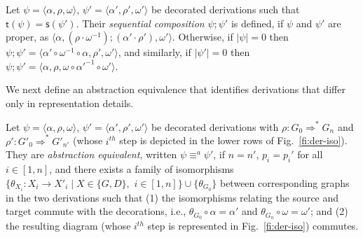 \documentclass[conference]{IEEEtran}
\newcommand{\Rrel}[1]   {\stackrel{{#1}}{\Longrightarrow}}
\newcommand{\interval}[2][1]{\ensuremath{[{#1},{#2}]}}
\newcommand{\source}[1]{\ensuremath{\mathsf{s}({#1})}}
\newcommand{\target}[1]{\ensuremath{\mathsf{t}({#1})}}
\begin{document}
\begin{definition}
\label{def:seq_com_decorated}
  Let $\psi = \langle \alpha, \rho, \omega \rangle$, $\psi' = \langle \alpha',
  \rho', \omega' \rangle$ be decorated derivations such that
  $\target{\psi} = \source{\psi'}$. Their \emph{sequential
  composition} $\psi ; \psi'$ is defined, if $\psi$ and
  $\psi'$ are proper, as 
    $\langle \alpha, (\rho \cdot \omega^{-1}); (\alpha' \cdot \rho'), \omega' \rangle$.
  Otherwise, if $|\psi|=0$ then $\psi ; \psi' =
  \langle \alpha' \circ \omega^{-1} \circ \alpha, \rho', \omega' \rangle$, and similarly,
  if $|\psi'| = 0$ then $\psi ; \psi' =
  \langle \alpha, \rho, \omega \circ {\alpha'}^{-1} \circ \omega' \rangle$.
\end{definition}

We next define an abstraction equivalence that identifies derivations that differ
only in representation details.

\begin{definition}
  \label{de:der-equiv1}
  Let $\psi = \langle \alpha, \rho, \omega \rangle$, $\psi' = \langle \alpha',
  \rho', \omega' \rangle$ be decorated derivations with $\rho: G_0
  \Rrel{}^{*} G_n$ and $\rho': G'_0 \Rrel{}^{*} G'_{n'}$
  (whose $i^{th}$ step is depicted in the lower rows of
  Fig.~\ref{fi:der-iso}).  They are \emph{abstraction equivalent}, 
  written  $\psi \equiv^{a} \psi'$, 
  if  $n = n'$,  $p_{i} = p_{i}'$ for all $i \in \interval{n}$,
  and there exists a family of isomorphisms
  $\{\theta_{X_i}: X_i \rightarrow X'_i \mid X \in \{G, D\},$
  $i \in \interval{n} \} \cup\{\theta_{G_0}\}$
  between corresponding graphs in the two derivations such that
  (1)
    the isomorphisms relating the source and target
    commute with the decorations, i.e., $\theta_{G_0} \circ \alpha = \alpha'$
    and $\theta_{G_n} \circ \omega = \omega'$; and
  (2) 
    the resulting diagram (whose $i^{th}$ step is represented in
    Fig.~\ref{fi:der-iso}) commutes.

\end{definition}
\end{document}
